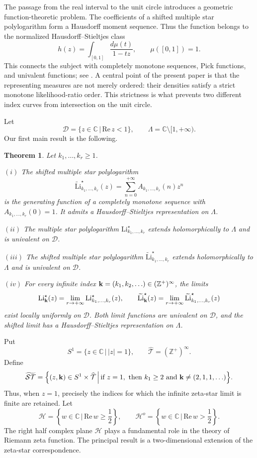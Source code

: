 \documentclass[12pt,a4paper]{amsart}
\numberwithin{equation}{section}
\theoremstyle{plain}
\newtheorem{Thm}{Theorem}[section]
\theoremstyle{definition}
\begin{document}
The passage from the real interval to the unit circle introduces a geometric function-theoretic problem.  The coefficients of a shifted multiple star polylogarithm form a Hausdorff moment sequence.  Thus the function belongs to the normalized Hausdorff--Stieltjes class
\[
h(z)=\int_{[0,1]}\frac{d\mu(t)}{1-tz},
\qquad \mu([0,1])=1.
\]  This connects the subject with completely monotone sequences, Pick functions, and univalent functions; see \cite{hau,wid,wir,Donoghue1974,GK}.  A central point of the present paper is that the representing measures are not merely ordered: their densities satisfy a strict monotone likelihood-ratio order.  This strictness is what prevents two different index curves from intersection on the unit circle.

Let
\[
\mathcal{D}=\{z\in\mathbb{C}\,|\,\mathrm{Re}\,z<1\},
\qquad
\Lambda=\mathbb{C}\setminus[1,+\infty).
\]
Our first main result is the following.

\begin{Thm}\label{cm}
Let $k_1,\ldots,k_r\geq 1$.

$(i)$ The shifted multiple star polylogarithm
\[
\widetilde{\mathrm{Li}}^{\star}_{k_1,\ldots,k_r}(z)
=\sum_{n=0}^{+\infty}A_{k_1,\ldots,k_r}(n)z^n
\]
is the generating function of a completely monotone sequence with $A_{k_1,\ldots,k_r}(0)=1$.  It admits a Hausdorff--Stieltjes representation on $\Lambda$.

$(ii)$ The multiple star polylogarithm $\mathrm{Li}^{\star}_{k_1,\ldots,k_r}$ extends holomorphically to $\Lambda$ and is univalent on $\mathcal{D}$.

$(iii)$ The shifted multiple star polylogarithm $\widetilde{\mathrm{Li}}^{\star}_{k_1,\ldots,k_r}$ extends holomorphically to $\Lambda$ and is univalent on $\mathcal{D}$.

$(iv)$ For every infinite index ${\bf k}=(k_1,k_2,\ldots)\in(\mathbb{Z}^{+})^{\infty}$, the limits
\[
\mathrm{Li}^{\star}_{\bf k}(z)
=\lim_{r\rightarrow+\infty}\mathrm{Li}^{\star}_{k_1,\ldots,k_r}(z),
\qquad
\widetilde{\mathrm{Li}}^{\star}_{\bf k}(z)
=\lim_{r\rightarrow+\infty}\widetilde{\mathrm{Li}}^{\star}_{k_1,\ldots,k_r}(z)
\]
exist locally uniformly on $\mathcal{D}$.  Both limit functions are univalent on $\mathcal{D}$, and the shifted limit has a Hausdorff--Stieltjes representation on $\Lambda$.
\end{Thm}

Put
\[
S^1=\{z\in\mathbb{C}\,|\,|z|=1\},
\qquad
\widehat{\mathcal{T}}=(\mathbb{Z}^{+})^{\infty}.
\]
Define
\[
\widetilde{\mathcal{ST}}=
\Big\{(z,{\bf k})\in S^1\times\widehat{\mathcal{T}}\,\Big|\,
\text{if }z=1,\text{ then }k_1\geq 2
\text{ and }{\bf k}\neq(2,1,1,\ldots)\Big\}.
\]
Thus, when $z=1$, precisely the indices for which the infinite zeta-star limit is finite are retained.  Let
\[
\mathcal{H}=\left\{w\in\mathbb{C}\,\bigg|\,\mathrm{Re}\,w\geq\frac12\right\},
\qquad
\mathcal{H}^{o}=\left\{w\in\mathbb{C}\,\bigg|\,\mathrm{Re}\,w>\frac12\right\}.
\]
The right half complex plane \(\mathcal{H}\)  plays a fundamental role in the theory of Riemann zeta function. The principal result is a two-dimensional extension of the zeta-star correspondence.
\end{document}
